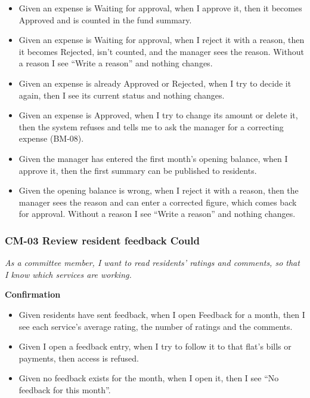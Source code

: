 \documentclass[11pt,a4paper]{report}
\begin{document}
\begin{itemize}
  \item Given an expense is Waiting for approval, when I approve it, then it becomes Approved and is counted in the fund summary.
  \item Given an expense is Waiting for approval, when I reject it with a reason, then it becomes Rejected, isn't counted, and the manager sees the reason. Without a reason I see ``Write a reason'' and nothing changes.
  \item Given an expense is already Approved or Rejected, when I try to decide it again, then I see its current status and nothing changes.
  \item Given an expense is Approved, when I try to change its amount or delete it, then the system refuses and tells me to ask the manager for a correcting expense (BM-08).
  \item Given the manager has entered the first month's opening balance, when I approve it, then the first summary can be published to residents.
  \item Given the opening balance is wrong, when I reject it with a reason, then the manager sees the reason and can enter a corrected figure, which comes back for approval. Without a reason I see ``Write a reason'' and nothing changes.
\end{itemize}

\subsubsection*{CM-03 \textperiodcentered{} Review resident feedback \textperiodcentered{} Could}

\emph{As a committee member, I want to read residents' ratings and comments, so that I know which services are working.}

\medskip\noindent\textbf{Confirmation}\par

\begin{itemize}
  \item Given residents have sent feedback, when I open Feedback for a month, then I see each service's average rating, the number of ratings and the comments.
  \item Given I open a feedback entry, when I try to follow it to that flat's bills or payments, then access is refused.
  \item Given no feedback exists for the month, when I open it, then I see ``No feedback for this month''.
\end{itemize}
\end{document}
